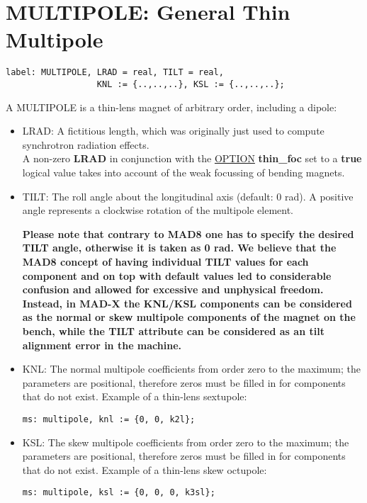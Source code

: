 
\section{MULTIPOLE: General Thin Multipole}

\begin{verbatim}
label: MULTIPOLE, LRAD = real, TILT = real,
                  KNL := {..,..,..}, KSL := {..,..,..};
\end{verbatim} 

A MULTIPOLE is a thin-lens magnet of arbitrary order, including a dipole: 
\begin{itemize}
    \item LRAD: A fictitious length, which was originally just used to
      compute synchrotron radiation effects. \\
      A non-zero \textbf{ LRAD } in conjunction  with the
      \href{../control/general.html#option}{OPTION}\textbf{ thin\_foc }
      set to a \textbf{ true } logical value takes into account of the
      weak focussing of bending magnets.  
    \item TILT: The roll angle about the longitudinal axis (default: 0
      rad). A positive angle represents a clockwise rotation of the
      multipole element.   

      \textbf{  Please note that contrary to MAD8 one has to specify the
        desired TILT angle, otherwise it is taken as 0 rad. We believe
        that the MAD8 concept of having individual TILT values for each
        component and on top with default values led to considerable
        confusion and allowed for excessive and unphysical
        freedom. Instead, in MAD-X the KNL/KSL components can be
        considered as the normal or skew multipole components of the
        magnet on the bench, while the TILT attribute can be considered
        as an tilt alignment error in the machine. } 

    \item KNL: The normal multipole coefficients from order zero to the
      maximum; the parameters are positional, therefore zeros must be
      filled in for components that do not exist. Example of a thin-lens
      sextupole:  
\begin{verbatim}
ms: multipole, knl := {0, 0, k2l};
\end{verbatim}

   \item KSL: The skew multipole coefficients from order zero to the
     maximum; the parameters are positional, therefore zeros must be
     filled in for components that do not exist. Example of a thin-lens
     skew octupole:  
\begin{verbatim}
ms: multipole, ksl := {0, 0, 0, k3sl};
\end{verbatim}

\end{itemize} 

